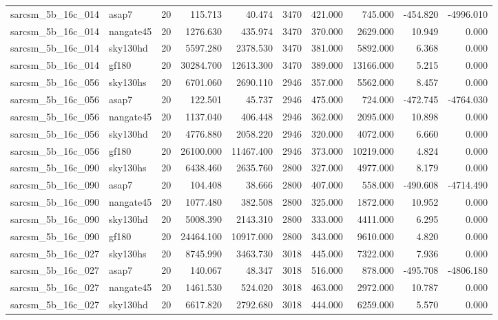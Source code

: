 \begin{tabular}{llrrrrrrrr}
sarcsm\_5b\_16c\_014 & asap7 & 20 & 115.713 & 40.474 & 3470 & 421.000 & 745.000 & -454.820 & -4996.010 \\
sarcsm\_5b\_16c\_014 & nangate45 & 20 & 1276.630 & 435.974 & 3470 & 370.000 & 2629.000 & 10.949 & 0.000 \\
sarcsm\_5b\_16c\_014 & sky130hd & 20 & 5597.280 & 2378.530 & 3470 & 381.000 & 5892.000 & 6.368 & 0.000 \\
sarcsm\_5b\_16c\_014 & gf180 & 20 & 30284.700 & 12613.300 & 3470 & 389.000 & 13166.000 & 5.215 & 0.000 \\
sarcsm\_5b\_16c\_056 & sky130hs & 20 & 6701.060 & 2690.110 & 2946 & 357.000 & 5562.000 & 8.457 & 0.000 \\
sarcsm\_5b\_16c\_056 & asap7 & 20 & 122.501 & 45.737 & 2946 & 475.000 & 724.000 & -472.745 & -4764.030 \\
sarcsm\_5b\_16c\_056 & nangate45 & 20 & 1137.040 & 406.448 & 2946 & 362.000 & 2095.000 & 10.898 & 0.000 \\
sarcsm\_5b\_16c\_056 & sky130hd & 20 & 4776.880 & 2058.220 & 2946 & 320.000 & 4072.000 & 6.660 & 0.000 \\
sarcsm\_5b\_16c\_056 & gf180 & 20 & 26100.000 & 11467.400 & 2946 & 373.000 & 10219.000 & 4.824 & 0.000 \\
sarcsm\_5b\_16c\_090 & sky130hs & 20 & 6438.460 & 2635.760 & 2800 & 327.000 & 4977.000 & 8.179 & 0.000 \\
sarcsm\_5b\_16c\_090 & asap7 & 20 & 104.408 & 38.666 & 2800 & 407.000 & 558.000 & -490.608 & -4714.490 \\
sarcsm\_5b\_16c\_090 & nangate45 & 20 & 1077.480 & 382.508 & 2800 & 325.000 & 1872.000 & 10.952 & 0.000 \\
sarcsm\_5b\_16c\_090 & sky130hd & 20 & 5008.390 & 2143.310 & 2800 & 333.000 & 4411.000 & 6.295 & 0.000 \\
sarcsm\_5b\_16c\_090 & gf180 & 20 & 24464.100 & 10917.000 & 2800 & 343.000 & 9610.000 & 4.820 & 0.000 \\
sarcsm\_5b\_16c\_027 & sky130hs & 20 & 8745.990 & 3463.730 & 3018 & 445.000 & 7322.000 & 7.936 & 0.000 \\
sarcsm\_5b\_16c\_027 & asap7 & 20 & 140.067 & 48.347 & 3018 & 516.000 & 878.000 & -495.708 & -4806.180 \\
sarcsm\_5b\_16c\_027 & nangate45 & 20 & 1461.530 & 524.020 & 3018 & 463.000 & 2972.000 & 10.787 & 0.000 \\
sarcsm\_5b\_16c\_027 & sky130hd & 20 & 6617.820 & 2792.680 & 3018 & 444.000 & 6259.000 & 5.570 & 0.000 \\

\end{tabular}

